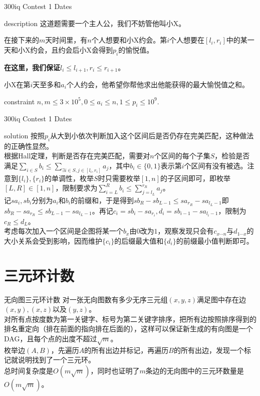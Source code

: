 \documentclass{beamer}
\def\le{\leqslant}
\begin{document}
\begin{frame}{300iq Contest 1 Dates}
	\begin{block}{description}
		这道题需要一个主人公，我们不妨管他叫小X。
		
		在接下来的$m$天时间里，有$n$个人想要和小X约会。第$i$个人想要在$[l_i,r_i]$中的某一天和小X约会，且约会后小X会得到$p_i$的愉悦值。
		
		\textbf{在这里，我们保证$l_i\le l_{i+1}, r_i \le r_{i+1}$}。
		
		小X在第$i$天至多和$a_i$个人约会，他希望你帮他求出他能获得的最大愉悦值之和。
	\end{block}
	\begin{block}{constraint}
		$n, m \le 3\times 10^5, 0 \le a_i \le n, 1 \le p_i \le 10^9.$
	\end{block}
\end{frame}
\begin{frame}{300iq Contest 1 Dates}
	\begin{block}{solution}
		按照$p_i$从大到小依次判断加入这个区间后是否仍存在完美匹配，这种做法的正确性显然。\\
		
		根据Hall定理，判断是否存在完美匹配，需要对$n$个区间的每个子集$S$，检验是否满足$\sum_{i \in S}b_i \le \sum_{\exists i \in S, j \in [l_i, r_i]}a_j$，其中$b_i \in \{0, 1\}$表示第$i$个区间有没有被选。注意到$\{l_i\}, \{r_i\}$的单调性，枚举$S$时只需要枚举$[1, n]$的子区间即可，即枚举$[L, R] \in [1, n]$，限制要求为$\sum_{i=L}^{R}b_i \le \sum_{j=l_L}^{r_R}a_j$。\\
		
		记$sa_i,sb_i$分别为$a_i$和$b_i$的前缀和，于是得到$sb_R-sb_{L-1}\le sa_{r_R}-sa_{l_L-1}$即$sb_R-sa_{r_R}\le sb_{L-1}-sa_{l_L-1}$。再记$c_i=sb_i-sa_{r_i},d_i=sb_{i-1}-sa_{l_i-1}$，限制为$c_R\le d_L$。\\
		
		考虑每次加入一个区间是企图将某一个$b_x$由$0$改为$1$，观察发现只会有$c_{x \cdots n}$与$d_{1 \cdots x}$的大小关系会受到影响，因而维护$\{c_i\}$的后缀最大值和$\{d_i\}$的前缀最小值判断即可。
	\end{block}
\end{frame}

\section{三元环计数}
\begin{frame}{无向图三元环计数}
	对一张无向图数有多少无序三元组$(x,y,z)$满足图中存在边$(x,y),(x,z)$以及$(y,z)$。\pause\\
	
	对所有点按度数为第一关键字、标号为第二关键字排序，把所有边按照排序得到的排名重定向（排在前面的指向排在后面的），这样可以保证新生成的有向图是一个DAG，且每个点的出度不超过$\sqrt m$。\\
	
	枚举边$(A,B)$，先遍历$A$的所有出边并标记，再遍历$B$的所有出边，发现一个标记就说明找到了一个三元环。\\
	
	总时间复杂度是$O(m\sqrt m)$，同时也证明了$m$条边的无向图中的三元环数量是$O(m\sqrt m)$。
\end{frame}
\end{document}
